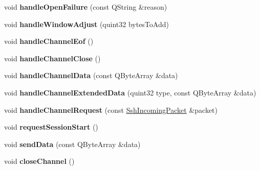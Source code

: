 \begin{DoxyCompactItemize}
\item 
\mbox{\label{class_q_ssh_1_1_internal_1_1_abstract_ssh_channel_a3edf2c5016854f91197a83a76a8313e0}} 
void {\bfseries handle\+Open\+Failure} (const Q\+String \&reason)
\item 
\mbox{\label{class_q_ssh_1_1_internal_1_1_abstract_ssh_channel_ae10f777b10a6abd2eedb135b53a10822}} 
void {\bfseries handle\+Window\+Adjust} (quint32 bytes\+To\+Add)
\item 
\mbox{\label{class_q_ssh_1_1_internal_1_1_abstract_ssh_channel_a30baa8b830952bbc690a4a28adae0067}} 
void {\bfseries handle\+Channel\+Eof} ()
\item 
\mbox{\label{class_q_ssh_1_1_internal_1_1_abstract_ssh_channel_a1b5431ce96fbc30d27e595066e8aa0e0}} 
void {\bfseries handle\+Channel\+Close} ()
\item 
\mbox{\label{class_q_ssh_1_1_internal_1_1_abstract_ssh_channel_a41237e436a783bdd1f357716dd894ef5}} 
void {\bfseries handle\+Channel\+Data} (const Q\+Byte\+Array \&data)
\item 
\mbox{\label{class_q_ssh_1_1_internal_1_1_abstract_ssh_channel_a4a7070f60d72d41aeace586ef5fd923b}} 
void {\bfseries handle\+Channel\+Extended\+Data} (quint32 type, const Q\+Byte\+Array \&data)
\item 
\mbox{\label{class_q_ssh_1_1_internal_1_1_abstract_ssh_channel_ad0e420c5b879c540147cd8a1ec9922c8}} 
void {\bfseries handle\+Channel\+Request} (const \mbox{\hyperlink{class_q_ssh_1_1_internal_1_1_ssh_incoming_packet}{Ssh\+Incoming\+Packet}} \&packet)
\item 
\mbox{\label{class_q_ssh_1_1_internal_1_1_abstract_ssh_channel_a9a084e9194408c406b986a46baa5a2b6}} 
void {\bfseries request\+Session\+Start} ()
\item 
\mbox{\label{class_q_ssh_1_1_internal_1_1_abstract_ssh_channel_a79b748eab127254329798baa364e14c9}} 
void {\bfseries send\+Data} (const Q\+Byte\+Array \&data)
\item 
\mbox{\label{class_q_ssh_1_1_internal_1_1_abstract_ssh_channel_a6802a2d50fbc888dcdf058f176f20840}} 
void {\bfseries close\+Channel} ()
\end{DoxyCompactItemize}
